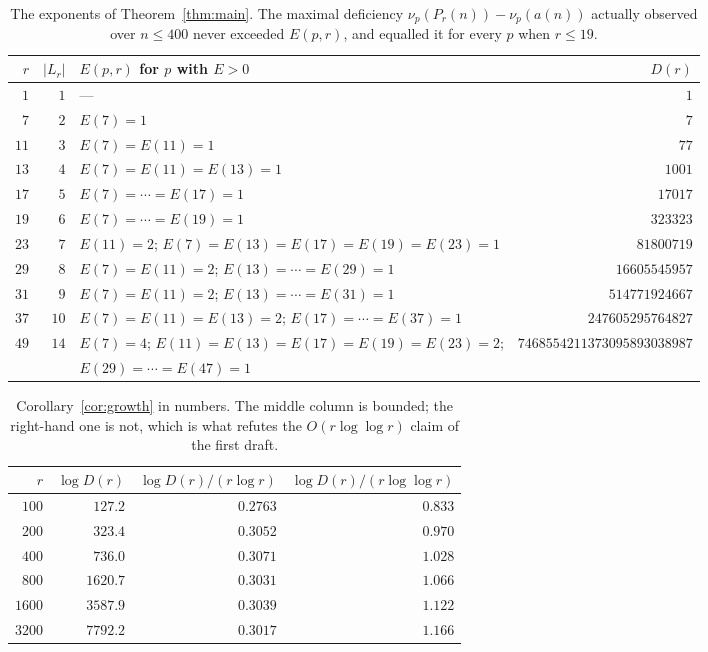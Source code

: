 \documentclass[11pt]{article}
\theoremstyle{plain}
\theoremstyle{definition}
\theoremstyle{remark}
\numberwithin{equation}{section}
\newcommand{\Lr}{L_r}
\begin{document}
\begin{table}[ht]
\centering
\small
\begin{tabular}{@{}rrlr@{}}
\toprule
$r$ & $|\Lr|$ & $E(p,r)$ for $p$ with $E>0$ & $D(r)$ \\
\midrule
$1$  & $1$  & --- & $1$ \\
$7$  & $2$  & $E(7)=1$ & $7$ \\
$11$ & $3$  & $E(7)=E(11)=1$ & $77$ \\
$13$ & $4$  & $E(7)=E(11)=E(13)=1$ & $1001$ \\
$17$ & $5$  & $E(7)=\cdots=E(17)=1$ & $17017$ \\
$19$ & $6$  & $E(7)=\cdots=E(19)=1$ & $323323$ \\
$23$ & $7$  & $E(11)=2$; $E(7)=E(13)=E(17)=E(19)=E(23)=1$ & $81800719$ \\
$29$ & $8$  & $E(7)=E(11)=2$; $E(13)=\cdots=E(29)=1$ & $16605545957$ \\
$31$ & $9$  & $E(7)=E(11)=2$; $E(13)=\cdots=E(31)=1$ & $514771924667$ \\
$37$ & $10$ & $E(7)=E(11)=E(13)=2$; $E(17)=\cdots=E(37)=1$ & $247605295764827$ \\
$49$ & $14$ & $E(7)=4$; $E(11)=E(13)=E(17)=E(19)=E(23)=2$; & $7468554211373095893038987$ \\
     &      & $E(29)=\cdots=E(47)=1$ & \\
\bottomrule
\end{tabular}
\caption{The exponents of Theorem~\ref{thm:main}. The maximal deficiency
$\nu_p(P_r(n)) - \nu_p(a(n))$ actually observed over $n \le 400$ never exceeded $E(p,r)$, and
equalled it for every $p$ when $r \le 19$.}
\label{tab:Dr-long}
\end{table}

\begin{table}[ht]
\centering
\small
\begin{tabular}{@{}rrrr@{}}
\toprule
$r$ & $\log D(r)$ & $\log D(r) / (r\log r)$ & $\log D(r)/(r \log\log r)$ \\
\midrule
$100$  & $127.2$  & $0.2763$ & $0.833$ \\
$200$  & $323.4$  & $0.3052$ & $0.970$ \\
$400$  & $736.0$  & $0.3071$ & $1.028$ \\
$800$  & $1620.7$ & $0.3031$ & $1.066$ \\
$1600$ & $3587.9$ & $0.3039$ & $1.122$ \\
$3200$ & $7792.2$ & $0.3017$ & $1.166$ \\
\bottomrule
\end{tabular}
\caption{Corollary~\ref{cor:growth} in numbers. The middle column is bounded; the right-hand one
is not, which is what refutes the $O(r\log\log r)$ claim of the first draft.}
\label{tab:growth}
\end{table}
\end{document}
